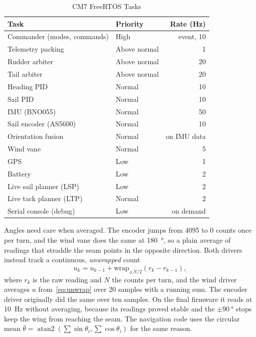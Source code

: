 \begin{table}[!t]
\caption{CM7 FreeRTOS Tasks}
\label{tab:tasks}
\centering
\begin{tabular}{@{}llr@{}}
\toprule
Task & Priority & Rate (Hz) \\
\midrule
Commander (modes, commands) & High         & event, 10 \\
Telemetry packing           & Above normal & 1 \\
Rudder arbiter              & Above normal & 20 \\
Tail arbiter                & Above normal & 20 \\
Heading PID                 & Normal       & 10 \\
Sail PID                    & Normal       & 10 \\
IMU (BNO055)                & Normal       & 50 \\
Sail encoder (AS5600)       & Normal       & 10 \\
Orientation fusion          & Normal       & on IMU data \\
Wind vane                   & Normal       & 5 \\
GPS                         & Low          & 1 \\
Battery                     & Low          & 2 \\
Live sail planner (LSP)     & Low          & 2 \\
Live tack planner (LTP)     & Normal       & 2 \\
Serial console (debug)      & Low          & on demand \\
\bottomrule
\end{tabular}
\end{table}

Angles need care when averaged. The encoder jumps from 4095 to 0 counts once
per turn, and the wind vane does the same at \SI{180}{\degree}, so a plain
average of readings that straddle the seam points in the opposite direction.
Both drivers instead track a continuous, \emph{unwrapped} count
\begin{equation}
u_k = u_{k-1} + \mathrm{wrap}_{\pm N/2}\!\left(r_k - r_{k-1}\right),
\label{eq:unwrap}
\end{equation}
where $r_k$ is the raw reading and $N$ the counts per turn, and the wind driver averages $u$ from~\eqref{eq:unwrap} over 20 samples with a
running sum. The encoder driver originally did the same over ten samples. On
the final firmware it reads at \SI{10}{\hertz} without averaging, because its
readings proved stable and the $\pm\SI{90}{\degree}$ stops keep the wing from
reaching the seam. The
navigation code uses the circular mean
$\bar{\theta} = \operatorname{atan2}(\sum\sin\theta_i, \sum\cos\theta_i)$ for
the same reason.

